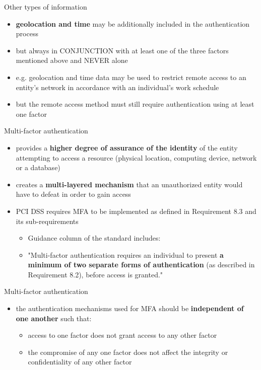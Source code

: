\documentclass[pdf]{beamer}
\begin{document}
\begin{frame}{Other types of information}
\begin{itemize}
\item
\textbf{geolocation and time} may be additionally included in the authentication process
\item
but always in CONJUNCTION with at least one of the three factors mentioned above and NEVER alone
\item
e.g. geolocation and time data may be used to restrict remote access to an entity’s network in accordance with an individual’s work schedule
\item
but the remote access method must still require authentication using at least one factor
\end{itemize}
\end{frame}



\begin{frame}{Multi-factor authentication}
\begin{itemize}
\item
provides a \textbf{higher degree of assurance of the identity} of the entity attempting to access a resource (physical location, computing device, network or a database)

\item
creates a \textbf{multi-layered mechanism} that an unauthorized entity would have to defeat in order to gain access

\item
PCI DSS requires MFA to be implemented as defined in Requirement 8.3 and its sub-requirements
\begin{itemize}
\item
Guidance column of the standard includes:
\item
"Multi-factor authentication requires an individual to present \textbf{a minimum of two separate forms of authentication} (as described in Requirement 8.2), before access is granted."
\end{itemize}
\end{itemize}
\end{frame}



\begin{frame}{Multi-factor authentication}
\begin{itemize}
\item
the authentication mechanisms used for MFA should be \textbf{independent of one another} such that:
\begin{itemize}
\item
access to one factor does not grant access to any other factor
\item
the compromise of any one factor does not affect the integrity or confidentiality of any other factor
\end{itemize}
\end{itemize}
\end{frame}
\end{document}
